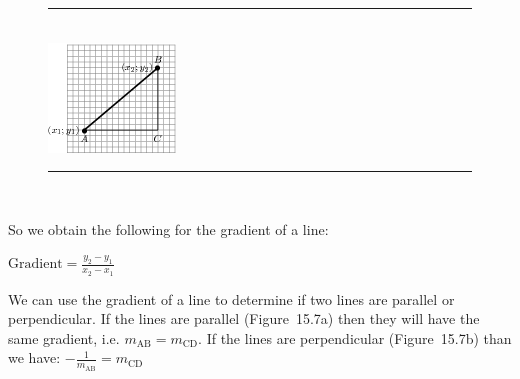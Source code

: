 	\begin{figure}[H] %
    \begin{center}
    \rule[.1in]{\figurerulewidth}{.005in} \\
        \label{m39108*uid42!!!underscore!!!media}\label{m39108*uid42!!!underscore!!!printimage}\includegraphics{col11306.imgs/m39108_MG10C14_018.png} %
        
      \vspace{2pt}
    \vspace{.1in}
    \rule[.1in]{\figurerulewidth}{.005in} \\
        
    \end{center}

 \end{figure}   

    \addtocounter{footnote}{-0}
    
        \label{m39108*eip-127}So we obtain the following for the gradient of a line:\par \label{m39108*id68147}\begin{math}\mathrm{Gradient}=\frac{{y}_{2}-{y}_{1}}{{x}_{2}-{x}_{1}}\end{math}\par 
        \label{m39108*eip-332}We can use the gradient of a line to determine if two lines are parallel or perpendicular. If the lines are parallel (Figure~15.7a) then they will have the same gradient, i.e. \begin{math}{m}_{\mathrm{AB}}={m}_{\mathrm{CD}}\end{math}. If the lines are perpendicular (Figure~15.7b) than we have: \begin{math}-\frac{1}{{m}_{\mathrm{AB}}}={m}_{\mathrm{CD}}\end{math}

 
    \setcounter{subfigure}{0}


